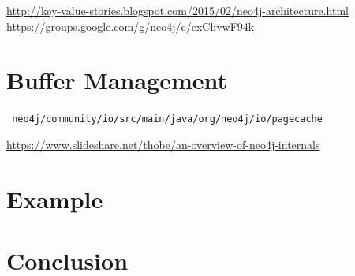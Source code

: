 \documentclass[a4paper,10pt]{article}
\begin{document}
\href{N4J Arch blog}{http://key-value-stories.blogspot.com/2015/02/neo4j-architecture.html} \\

\href{Followup discussion w devs}{https://groups.google.com/g/neo4j/c/cxClivwF94k}

\section{Buffer Management}
\texttt{
neo4j/community/io/src/main/java/org/neo4j/io/pagecache
}

\href{Page Cache layout ??? Outdated ???}{https://www.slideshare.net/thobe/an-overview-of-neo4j-internals} \\



\section{Example}

\section{Conclusion}
\end{document}
